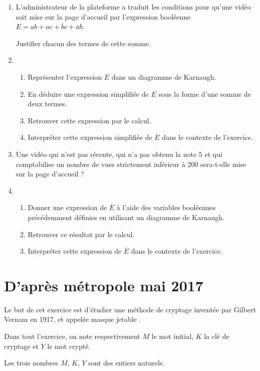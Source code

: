 \documentclass[a4paper,12pt]{article}
\begin{document}
\begin{enumerate}[\bfseries 1.]
    \item L'administrateur de la plateforme a traduit les conditions pour qu'une vidéo soit mise sur la page
    d'accueil par l'expression booléenne $E = ab + a c + \overline{b} c + \overline{a} b$.

    Justifier chacun des termes de cette somme.
    \item
    \begin{enumerate}[\bfseries a.]
        \item Représenter l'expression $E$ dans un diagramme de Karnaugh.
        \item En déduire une expression simplifiée de $E$ sous la forme d'une somme de deux termes.
        \item Retrouver cette expression par le calcul.
        \item Interpréter cette expression simplifiée de $E$ dans le contexte de l'exercice.
    \end{enumerate}
    \item  Une vidéo qui n'est pas récente, qui n'a pas obtenu la note 5 et qui comptabilise un nombre de
    vues strictement inférieur à 200 sera-t-elle mise sur la page d'accueil ?
    \item  \begin{enumerate}[\bfseries a.]
        \item 	Donner une expression de $\overline{E}$ à l'aide des variables booléennes précédemment définies en utilisant un diagramme de Karnaugh.
        \item 	Retrouver ce résultat par le calcul.
        \item 	Interpréter cette expression de $\overline{E}$ dans le contexte de l'exercice.
    \end{enumerate}
\end{enumerate}

\section*{D'après métropole mai 2017}

Le but de cet exercice est d'étudier une méthode de cryptage inventée par Gilbert Vernam en 1917, et appelée \og masque jetable \fg.

Dans tout l'exercice, on note respectivement $M$ le mot initial, $K$ la clé de cryptage et $Y$ le mot crypté.

Les trois nombres $M$, $K$, $Y$ sont des entiers naturels.
\end{document}
